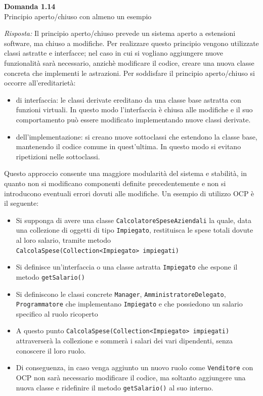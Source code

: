 \documentclass{article}
\newenvironment{problem}[2][Domanda]
    { \begin{mdframed}[backgroundcolor=gray!20] \textbf{#1 #2} \\}
    {  \end{mdframed}}
\newenvironment{solution}
    {\textit{Risposta:}}
    {}
\begin{document}
\begin{problem}{1.14}
Principio aperto/chiuso con almeno un esempio
\end{problem}
\begin{solution}
Il principio aperto/chiuso prevede un sistema aperto a estensioni software, ma chiuso a modifiche.
\newline
Per realizzare questo principio vengono utilizzate classi astratte e interfacce; nel caso in cui si vogliano aggiungere nuove funzionalità sarà necessario, anzichè modificare il codice, creare una nuova classe concreta che implementi le astrazioni.
\newline
Per soddisfare il principio aperto/chiuso si occorre all’ereditarietà:
\begin{itemize}
	\item di interfaccia: le classi derivate ereditano da una classe base astratta con
	funzioni virtuali. In questo modo l’interfaccia è chiusa alle modifiche e il suo comportamento può
	essere modificato implementando nuove classi derivate.
	\item dell’implementazione: si creano nuove sottoclassi che estendono la classe base, mantenendo il codice comune in quest'ultima.
	\newline
	In questo modo si evitano ripetizioni nelle sottoclassi.
\end{itemize}


Questo approccio consente una maggiore modularità del sistema e stabilità, in quanto non si modificano componenti definite precedentemente e non si introducono eventuali errori dovuti alle modifiche.
Un esempio di utilizzo OCP è il seguente:
\begin{itemize}
	\item Si supponga di avere una classe \texttt{CalcolatoreSpeseAziendali} la quale, data una collezione di oggetti di tipo \texttt{Impiegato}, restituisca le spese totali dovute al loro salario, tramite metodo\\ \texttt{CalcolaSpese(Collection<Impiegato> impiegati)}
	\item Si definisce un'interfaccia o una classe astratta \texttt{Impiegato} che espone il metodo \texttt{getSalario()}
	\item Si definiscono le classi concrete \texttt{Manager}, \texttt{AmministratoreDelegato}, \texttt{Programmatore} che implementano \texttt{Impiegato} e che possiedono un salario specifico al ruolo ricoperto
	\item A questo punto \texttt{CalcolaSpese(Collection<Impiegato> impiegati)} attraverserà la collezione e sommerà i salari dei vari dipendenti, senza conoscere il loro ruolo.
	\item Di conseguenza, in caso venga aggiunto un nuovo ruolo come \texttt{Venditore} con OCP non sarà necessario modificare il codice, ma soltanto aggiungere una nuova classe e ridefinire il metodo \texttt{getSalario()} al suo interno.
\end{itemize}
\end{solution}
\end{document}
